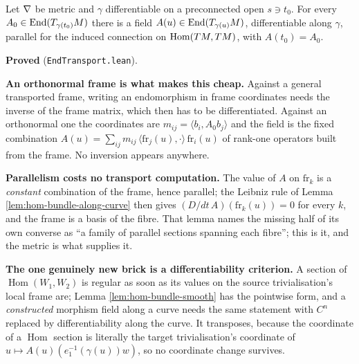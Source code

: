 \begin{lemma}
  \label{lem:end-transport}
  \leanok
  Let $\nabla$ be metric and $\gamma$ differentiable on a preconnected open $s \ni t_0$. For
  every $A_0 \in \operatorname{End}(T_{\gamma(t_0)}M)$ there is a field
  $A(u) \in \operatorname{End}(T_{\gamma(u)}M)$, differentiable along $\gamma$, parallel
  for the induced connection on $\operatorname{Hom}(TM,TM)$, with $A(t_0) = A_0$.

  \textbf{Proved} (\texttt{EndTransport.lean}).

  \textbf{An orthonormal frame is what makes this cheap.} Against a general transported frame,
  writing an endomorphism in frame coordinates needs the inverse of the frame matrix, which then
  has to be differentiated. Against an orthonormal one the coordinates are
  $m_{ij} = \langle b_i, A_0 b_j\rangle$ and the field is the fixed combination
  $A(u) = \sum_{ij} m_{ij}\,\langle \mathrm{fr}_j(u),\cdot\rangle\,\mathrm{fr}_i(u)$
  of rank-one operators built from the frame. No inversion appears anywhere.

  \textbf{Parallelism costs no transport computation.} The value of $A$ on $\mathrm{fr}_k$ is a
  \emph{constant} combination of the frame, hence parallel; the Leibniz rule of Lemma
  \ref{lem:hom-bundle-along-curve} then gives $(D/dt\,A)(\mathrm{fr}_k(u)) = 0$ for every
  $k$, and the frame is a basis of the fibre. That lemma names the missing half of its own
  converse as ``a family of parallel sections spanning each fibre''; this is it, and the metric
  is what supplies it.

  \textbf{The one genuinely new brick is a differentiability criterion.} A section of
  $\operatorname{Hom}(W_1,W_2)$ is regular as soon as its values on the source trivialisation's
  local frame are; Lemma \ref{lem:hom-bundle-smooth} has the pointwise form, and a
  \emph{constructed} morphism field along a curve needs the same statement with
  $C^n$ replaced by differentiability along the curve. It transposes, because the coordinate of
  a $\operatorname{Hom}$ section is literally the target trivialisation's coordinate of
  $u \mapsto A(u)(e_1^{-1}(\gamma(u))w)$, so no coordinate change survives.


\end{lemma}
